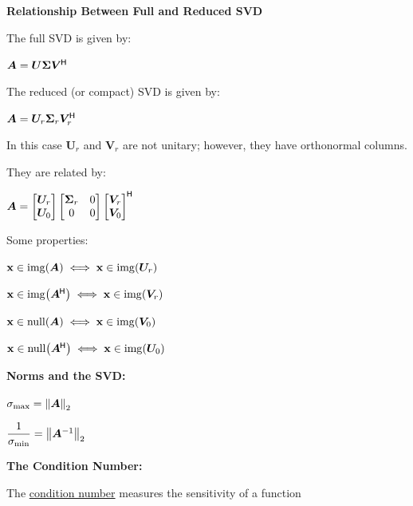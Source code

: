 \documentclass[11pt]{article}
\begin{document}
  \vspace{12pt}

  \textbf{Relationship Between Full and Reduced SVD}

  The full SVD is given by:

  \(\bm{A} = \bm{U}\bm{\Sigma}\bm{V}^{\mkern-1.5mu\mathsf{H}}\)

  \vspace{12pt}

  The reduced (or compact) SVD is given by:

  \(\bm{A} = \bm{U}_r\bm{\Sigma}_r\bm{V}_r^{\mkern-1.5mu\mathsf{H}}\)

  In this case \(\bm{U}_r\) and \(\bm{V}_r\) are not unitary; however, they have orthonormal columns.


  \vspace{12pt}

  They are related by:

  \(\bm{A} =
  \begin{bmatrix}
    \bm{U}_r \\ \bm{U}_0
  \end{bmatrix}
  \begin{bmatrix}
    \bm{\Sigma}_r & 0 \\
    0 & 0
  \end{bmatrix}
  \begin{bmatrix}
    \bm{V}_r \\ \bm{V}_0
  \end{bmatrix}^{\mkern-1.5mu\mathsf{H}}\)

  \vspace{12pt}

  Some properties:

  \(\mathbf{x} \in \mathrm{img}{\left( \bm{A} \right)} \iff \mathbf{x} \in \mathrm{img}{\left( \bm{U}_r \right)}\)

  \(\mathbf{x} \in \mathrm{img}{\left( \bm{A}^{\mkern-1.5mu\mathsf{H}} \right)} \iff \mathbf{x} \in \mathrm{img}{\left( \bm{V}_r \right)}\)

  \(\mathbf{x} \in \mathrm{null}{\left( \bm{A} \right)} \iff\mathbf{x} \in \mathrm{img}{\left( \bm{V}_0 \right)}\)

  \(\mathbf{x} \in \mathrm{null}{\left( \bm{A}^{\mkern-1.5mu\mathsf{H}} \right)} \iff \mathbf{x} \in \mathrm{img}{\left( \bm{U}_0 \right)}\)

  \pagebreak

  \textbf{Norms and the SVD:}

  \(\sigma_{\textrm{max}} = \left\lVert\bm{A}\right\rVert_2\)

  \(\dfrac{1}{\sigma_{\textrm{min}}} = \left\lVert\bm{A}^{-1}\right\rVert_2\)

  \textbf{The Condition Number:}

  The \href{https://www.wikiwand.com/en/Condition_number}{condition number} measures the sensitivity of a function
\end{document}
